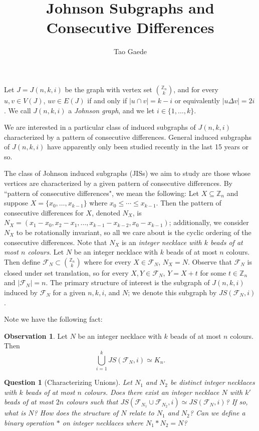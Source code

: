 \documentclass[12]{article}
\title{ \vspace{-3cm} Johnson Subgraphs and Consecutive Differences}
\author{Tao Gaede}
\newcommand{\Z}{\mathbb{Z}}
\newtheorem{question}{Question}
\theoremstyle{definition}
\newtheorem{obs}{Observation}
\begin{document}
	\maketitle

	Let $J = J(n,k,i)$ be the graph with vertex set ${\Z_n \choose k}$, and for every $u,v \in V(J)$, $uv \in E(J)$ if and only if $|u \cap v| = k-i$ or equivalently $|u \Delta v| = 2i$.  We call $J(n,k,i)$ a \emph{Johnson graph}, and we let $i \in \{1,\ldots,k\}$.
	
	We are interested in a particular class of induced subgraphs of $J(n,k,i)$ characterized by a pattern of consecutive differences.  General induced subgraphs of $J(n,k,i)$ have apparently only been studied recently in the last 15 years or so.
	
	The class of Johnson induced subgraphs (JISs) we aim to study are those whose vertices are characterized by a given pattern of consecutive differences.  By ``pattern of consecutive differences", we mean the following: Let $X \subseteq \Z_n$ and suppose $X = \{x_0,\ldots,x_{k-1}\}$ where $x_0 \leq \cdots \leq x_{k-1}$.  Then the pattern of consecutive differences for $X$, denoted $N_X$, is $N_X = (x_1-x_0,x_2-x_1,\ldots,x_{k-1} - x_{k-2}, x_0 - x_{k-1})$; additionally, we consider $N_X$ to be rotationally invariant, so all we care about is the cyclic ordering of the consecutive differences.  Note that $N_X$ is an \emph{integer necklace with $k$ beads of at most $n$ colours}.    Let $N$ be an integer necklace with $k$ beads of at most $n$ colours.  Then define $\mathcal{F}_N \subset {\Z_n \choose k}$ where for every $X \in \mathcal{F}_N$, $N_X = N$.  Observe that $\mathcal{F}_N$ is closed under set translation, so for every $X,Y \in \mathcal{F}_N$, $Y = X + t$ for some $t \in \Z_n$ and $|\mathcal{F}_N| = n$.  The primary structure of interest is the subgraph of $J(n,k,i)$ induced by $\mathcal{F}_N$ for a given $n,k,i$, and $N$; we denote this subgraph by $JS(\mathcal{F}_N,i)$.
	
	Note we have the following fact:
	\begin{obs}
		Let $N$ be an integer necklace with $k$ beads of at most $n$ colours.  Then
		$$\bigcup_{i=1}^{k} JS(\mathcal{F}_N,i) \simeq K_n.$$
	\end{obs}
	
	\begin{question}[Characterizing Unions]
		Let $N_1$ and $N_2$ be distinct integer necklaces with $k$ beads of at most $n$ colours.  Does there exist an integer necklace $N$ with $k'$ beads of at most $2n$ colours such that $JS(\mathcal{F}_{N_1} \cup \mathcal{F}_{N_2},i) \simeq JS(\mathcal{F}_N,i)$?  If so, what is $N$?  How does the structure of $N$ relate to $N_1$ and $N_2$?  Can we define a binary operation $*$ on integer necklaces where $N_1 * N_2 = N$?
	\end{question}
	
\end{document}
